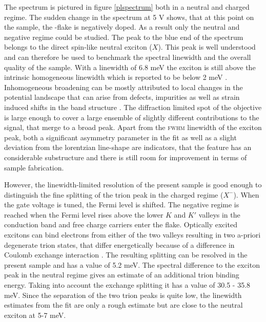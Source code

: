 The \pl spectrum is pictured in figure \ref{plspectrum} both in a neutral and charged regime. The sudden change in the spectrum at 5 V shows, that at this point on the sample, the \tmd-flake is negatively doped. As a result only the neutral and negative regime could be studied. The peak to the blue end of the spectrum belongs to the direct spin-like neutral exciton ($X$). This peak is well understood and can therefore be used to benchmark the spectral linewidth and the overall quality of the sample. With a linewidth of 6.8 meV the exciton is still above the intrinsic homogeneous linewidth which is reported to be below 2 meV \cite{moody_intrinsic_2015, ajayi_approaching_2017}. Inhomogeneous broadening can be mostly attributed to local changes in the potential landscape that can arise from defects, impurities as well as strain induced shifts in the band structure \cite{zhu_strain_2013}. The diffraction limited spot of the objective is large enough to cover a large ensemble of slightly different contributions to the \pl signal, that merge to a broad peak. Apart from the \textsc{fwhm} linewidth of the exciton peak, both a significant asymmetry parameter in the fit as well as a slight deviation from the lorentzian line-shape are indicators, that the feature has an considerable substructure and there is still room for improvement in terms of sample fabrication.

However, the linewidth-limited resolution of the present sample is good enough to distinguish the fine splitting of the trion peak in the charged regime ($X^-$). When the gate voltage is tuned, the Fermi level is shifted. The negative regime is reached when the Fermi level rises above the lower $K$ and $K'$ valleys in the conduction band and free charge carriers enter the flake. Optically excited excitons can bind electrons from either of the two valleys resulting in two a-priori degenerate trion states, that differ energetically because of a difference in Coulomb exchange interaction  \cite{courtade_charged_2017}. The resulting splitting can be resolved in the present sample and has a value of 5.2 meV. The spectral difference to the exciton peak in the neutral regime gives an estimate of an additional trion binding energy. Taking into account the exchange splitting it has a value of 30.5 - 35.8 meV. Since the separation of the two trion peaks is quite low, the linewidth estimates from the fit are only a rough estimate but are close to the neutral exciton at 5-7 meV.

